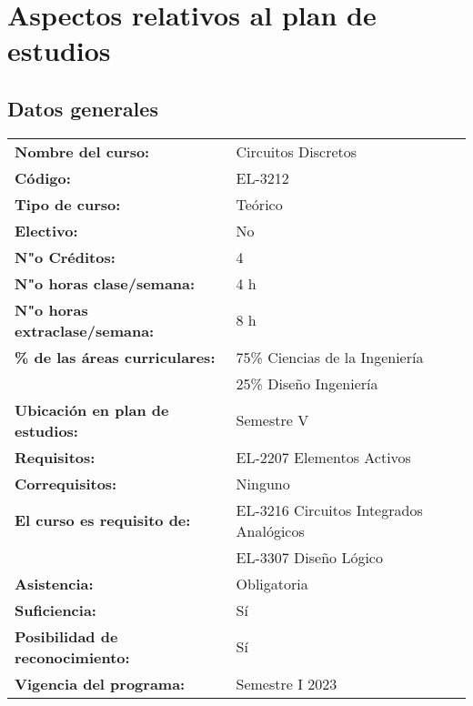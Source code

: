 \documentclass[11pt,oneside,letterpaper]{article}
\renewcommand{\CodigoCurso}{EL-3212}
\renewcommand{\NombreCurso}{Circuitos Discretos}
\begin{document}
\graphicspath{{./}{./fig/}{./img/}}

\paginaTitulo

\section{Aspectos relativos al plan de estudios}

\subsection{Datos generales}

\hspace*{-\margoffset}
\begin{tabular}{ll}
  \textbf{Nombre del curso:}              & \NombreCurso \\[1ex]
  \textbf{Código:}                        & \CodigoCurso \\[1ex]
  \textbf{Tipo de curso:}                 & Teórico \\[1ex]
  \textbf{Electivo:}                      & No \\[1ex]
  \textbf{N"o Créditos:}                  & 4 \\[1ex]
  \textbf{N"o horas clase/semana:}        & 4 h  \\[1ex]
  \textbf{N"o horas extraclase/semana:}   & 8 h \\[1ex]
  \textbf{\% de las áreas curriculares:}  & 75\% Ciencias de la Ingeniería \\
                                          & 25\% Diseño Ingeniería \\[1ex]
  \textbf{Ubicación en plan de estudios:} & Semestre V \\[1ex]
  \textbf{Requisitos:}                    & EL-2207 Elementos Activos \\[1ex]
  \textbf{Correquisitos:}                 & Ninguno \\[1ex]
  \textbf{El curso es requisito de:}      & EL-3216 Circuitos Integrados Analógicos \\
                                          & EL-3307 Diseño Lógico \\[1ex]
  \textbf{Asistencia:}                    & Obligatoria \\[1ex]
  \textbf{Suficiencia:}                   & Sí \\[1ex]
  \textbf{Posibilidad de reconocimiento:} & Sí \\[1ex]
  \textbf{Vigencia del programa:}         & Semestre I 2023 \\[1ex]
\end{tabular} 
\end{document}
